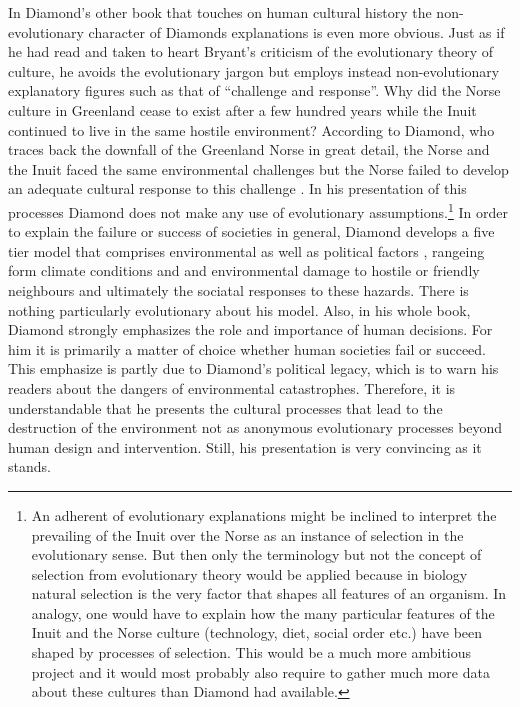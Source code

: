 In Diamond's other book that touches on human cultural history the
non-evolutionary character of Diamonds explanations is even more
obvious. Just as if he had read and taken to heart Bryant's criticism
of the evolutionary theory of culture, he avoids the evolutionary
jargon but employs instead non-evolutionary explanatory figures such
as that of ``challenge and response''.  Why did the Norse culture in
Greenland cease to exist after a few hundred years while the Inuit
continued to live in the same hostile environment?  According to
Diamond, who traces back the downfall of the Greenland Norse in great
detail, the Norse and the Inuit faced the same environmental
challenges but the Norse failed to develop an adequate cultural
response to this challenge \cite[p.\ 248ff.]{diamond:2005}. In his
presentation of this processes Diamond does not make any use of
evolutionary assumptions.\footnote{An adherent of evolutionary
  explanations might be inclined to interpret the prevailing of the
  Inuit over the Norse as an instance of selection in the evolutionary
  sense. But then only the terminology but not the concept of
  selection from evolutionary theory would be applied because in
  biology natural selection is the very factor that shapes all
  features of an organism. In analogy, one would have to explain how
  the many particular features of the Inuit and the Norse culture
  (technology, diet, social order etc.) have been shaped by processes
  of selection. This would be a much more ambitious project and it
  would most probably also require to gather much more data about
  these cultures than Diamond had available.} In order to explain the
failure or success of societies in general, Diamond develops a five
tier model that comprises environmental as well as political factors
\cite[p.\ 10-15]{diamond:2005}, rangeing form climate conditions and
and environmental damage to hostile or friendly neighbours and
ultimately the sociatal responses to these hazards. There is nothing
particularly evolutionary about his model. Also, in his whole book,
Diamond strongly emphasizes the role and importance of human
decisions.  For him it is primarily a matter of choice whether human
societies fail or succeed. This emphasize is partly due to Diamond's
political legacy, which is to warn his readers about the dangers of
environmental catastrophes.  Therefore, it is understandable that he
presents the cultural processes that lead to the destruction of the
environment not as anonymous evolutionary processes beyond human
design and intervention. Still, his presentation is very convincing as
it stands.

